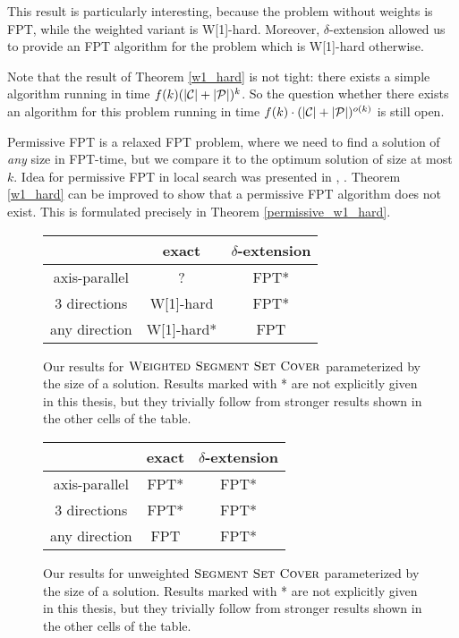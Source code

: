 This result is particularly interesting,
because the problem without weights is FPT,
while the weighted variant is W[1]-hard.
Moreover, $\delta$-extension allowed us to provide an FPT algorithm
for the problem which is W[1]-hard otherwise.

Note that the result of Theorem \ref{w1_hard} is not tight:
there exists a simple algorithm 
running in time ${f(k)(|\mathcal{C}| + |\mathcal{P}|)^k}$.
So the question whether there exists an algorithm
for this problem running in time ${f(k)\cdot(|\mathcal{C}| + |\mathcal{P}|)^{o(k)}}$
is still open.

Permissive FPT is a relaxed FPT problem, where 
we need to find a solution of \textit{any} size in FPT-time,
but we compare it to the optimum solution of size at most $k$.
Idea for permissive FPT in local search was presented
in \cite{permissive_problem1}, \cite{permissive_problem2}.
Theorem \ref{w1_hard} can be improved to show that a permissive FPT
algorithm does not exist.
This is formulated precisely in Theorem \ref{permissive_w1_hard}.

\begin{figure}[h]
\begin{center}
\begin{tabular}{ | c | c | c | }
\hline
                & exact     & $\delta$-extension \\ 
\hline                
 axis-parallel   & ? & FPT* \\  
\hline                
 3 directions    & W[1]-hard & FPT* \\  
\hline                
 any direction   & W[1]-hard* & FPT \\
\hline                
\end{tabular}
\caption{Our results for $\textsc{Weighted Segment Set Cover}$
parameterized by the size of a solution.
Results marked with * are not explicitly given in this thesis,
but they trivially follow from stronger results shown in the other cells of the table.}
\label{tab:weighted_fpt}
\end{center}
\end{figure}

\begin{figure}[h]
\begin{center}
\begin{tabular}{ | c | c | c | }
\hline
                & exact     & $\delta$-extension \\ 
\hline                
 axis-parallel   & FPT* & FPT* \\  
\hline                
 3 directions    & FPT* & FPT* \\  
\hline                
 any direction   & FPT  & FPT* \\
\hline                
\end{tabular}
\caption{Our results for unweighted $\textsc{Segment Set Cover}$
parameterized by the size of a solution.
Results marked with * are not explicitly given in this thesis,
but they trivially follow from stronger results shown in the other cells of the table.}
\label{tab:unweighted_fpt}
\end{center}
\end{figure}

